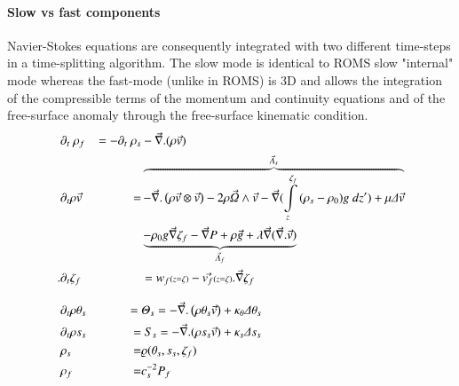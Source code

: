  \paragraph{Slow vs fast components}
\indent Navier-Stokes equations are consequently integrated with two different time-steps in a time-splitting algorithm. The slow mode is identical to ROMS slow "internal" mode whereas the fast-mode (unlike in ROMS) is 3D and allows the integration of the compressible terms of the momentum and continuity equations and of the free-surface anomaly through the free-surface kinematic condition.
\begin{equation}
  \begin{split}
    \displaystyle
   &\partial_t\ \rho_f &= -\partial_t\ \rho_{s}
   &-\vec{\nabla}.(\rho\vec{v})\\
   &\partial_t\rho\vec{v} &= 
   & \overbrace{-\vec{\nabla}.\left(\rho\vec{v}\otimes\vec{v}\right)
   -2\rho\vec{\Omega}\wedge\vec{v}
   -\vec\nabla(\int\limits_z^{\zeta_f}{(\rho_{s}-\rho_0)g\ dz'})
   +\mu\Delta\vec{v}}^{\vec{\Lambda}_{s}}\\
   & & &\underbrace{-\rho_{0}g\vec\nabla\zeta_f
   -\vec\nabla{P}
   +\rho\vec{g}
   +\lambda\vec{\nabla}(\vec{\nabla}.\vec{v})}_{\vec{\Lambda}_{f}}\\
.   &\partial_t{\zeta_f} &&= 
   w_f\scriptstyle(z=\zeta)\textstyle
   -\vec{v_f}\scriptstyle(z=\zeta)\textstyle.\vec{\nabla}{\zeta_f}\\[3mm]
   &\partial_t{\rho\theta_s} &=\ &\Theta_{s}=-\vec{\nabla}.\left(\rho\theta_s\vec{v}\right)
   +\kappa_{\theta}\Delta\theta_s\\
   &\partial_t{\rho s_s} &= &\ S_{s}= -\vec{\nabla}.(\rho s_s\vec{v})
   +\kappa_{s}\Delta{s_s}\\
   &\rho_s &= &\varrho(\theta_s,s_s,\zeta_f)\\
   &\rho_f &= &c_s^{-2} P_f
  \end{split}
\end{equation}
  
